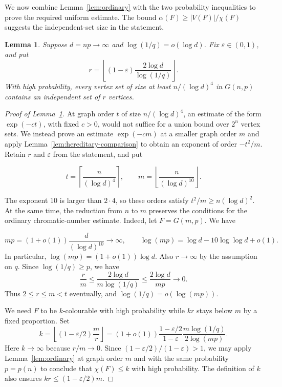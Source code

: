 \documentclass[11pt]{article}
\newtheorem{lemma}[theorem]{Lemma}
\numberwithin{equation}{section}
\begin{document}
  {We now combine Lemma~\ref{lem:ordinary} with the two probability inequalities to prove the required uniform estimate. The bound $\alpha(F)\ge |V(F)|/\chi(F)$ suggests the independent-set size in the statement.}

  
\begin{lemma}\label{lem:uniform-independent}
Suppose $d=np\to\infty$ and $\log(1/q)=o(\log d)$. Fix $\varepsilon\in(0,1)$, and put
\[
 r=\left\lfloor(1-\varepsilon)
              \frac{2\log d}{\log(1/q)}\right\rfloor.
\]
With high probability, every vertex set of size at least $n/(\log d)^4$ in $G(n,p)$ contains an independent set of $r$ vertices.
\end{lemma}
 

\begin{proof}[Proof of Lemma~\ref{lem:uniform-independent}]
  
At graph order $t$ of size $n/(\log d)^4$, an estimate of the form $\exp(-ct)$, with fixed $c>0$, would not suffice for a union bound over $2^n$ vertex sets. We instead prove an estimate $\exp(-cm)$ at a smaller graph order $m$ and apply Lemma~\ref{lem:hereditary-comparison} to obtain an exponent of order $-t^2/m$. Retain $r$ and $\varepsilon$ from the statement, and put
 
\[
 t=\left\lceil\frac{n}{(\log d)^4}\right\rceil,
 \qquad
 m=\left\lfloor\frac{n}{(\log d)^{10}}\right\rfloor.
\]
  
The exponent $10$ is larger than $2\cdot4$, so these orders satisfy $t^2/m\ge n(\log d)^2$. At the same time, the reduction from $n$ to $m$ preserves the conditions for the ordinary chromatic-number estimate. Indeed, let $F=G(m,p)$. We have
 
\[
 mp=(1+o(1))\frac{d}{(\log d)^{10}}\to\infty,
 \qquad
 \log(mp)=\log d-10\log\log d+o(1).
\]
In particular, $\log(mp)=(1+o(1))\log d$. Also $r\to\infty$ by the assumption on $q$. Since $\log(1/q)\ge p$, we have
\[
 \frac rm\le\frac{2\log d}{m\log(1/q)}
 \le\frac{2\log d}{mp}\longrightarrow0.
\]
Thus $2\le r\le m<t$ eventually, and $\log(1/q)=o(\log(mp))$.

We need $F$ to be $k$-colourable with high probability while $kr$ stays below $m$ by a fixed proportion. Set
\[
 k=\left\lfloor(1-\varepsilon/2)\frac mr\right\rfloor
 =(1+o(1))\frac{1-\varepsilon/2}{1-\varepsilon}
       \frac{m\log(1/q)}{2\log(mp)}.
\]
Here $k\to\infty$ because $r/m\to0$. Since $(1-\varepsilon/2)/(1-\varepsilon)>1$, we may apply Lemma~\ref{lem:ordinary} at graph order $m$ and with the same probability $p=p(n)$ to conclude that $\chi(F)\le k$ with high probability.   {The definition of $k$ also ensures $kr\le(1-\varepsilon/2)m$.}


\end{proof}
\end{document}
